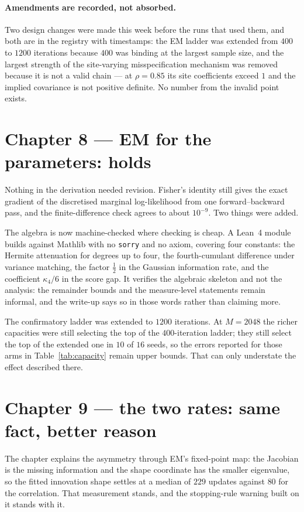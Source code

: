 \documentclass[11pt,a4paper]{article}
\begin{document}
\paragraph{Amendments are recorded, not absorbed.}
Two design changes were made this week before the runs that used them, and both are in the
registry with timestamps: the EM ladder was extended from $400$ to $1200$ iterations because $400$
was binding at the largest sample size, and the largest strength of the site-varying
misspecification mechanism was removed because it is not a valid chain --- at $\rho=0.85$ its site
coefficients exceed $1$ and the implied covariance is not positive definite. No number from the
invalid point exists.

\section{Chapter 8 --- EM for the parameters: holds}\label{sec:ch8}

Nothing in the derivation needed revision. Fisher's identity still gives the exact gradient of the
discretised marginal log-likelihood from one forward--backward pass, and the finite-difference
check agrees to about $10^{-9}$. Two things were added.

The algebra is now machine-checked where checking is cheap. A Lean~4 module builds against Mathlib
with no \texttt{sorry} and no axiom, covering four constants: the Hermite attenuation for degrees
up to four, the fourth-cumulant difference under variance matching, the factor $\tfrac12$ in the
Gaussian information rate, and the coefficient $\kappa_4/6$ in the score gap. It verifies the
algebraic skeleton and not the analysis: the remainder bounds and the measure-level statements
remain informal, and the write-up says so in those words rather than claiming more.

The confirmatory ladder was extended to $1200$ iterations. At $M=2048$ the richer capacities were
still selecting the top of the $400$-iteration ladder; they still select the top of the extended
one in $10$ of $16$ seeds, so the errors reported for those arms in Table~\ref{tab:capacity}
remain upper bounds. That can only understate the effect described there.

\section{Chapter 9 --- the two rates: same fact, better reason}\label{sec:ch9}

The chapter explains the asymmetry through EM's fixed-point map: the Jacobian is the missing
information and the shape coordinate has the smaller eigenvalue, so the fitted innovation shape
settles at a median of $229$ updates against $80$ for the correlation. That measurement stands,
and the stopping-rule warning built on it stands with it.
\end{document}
